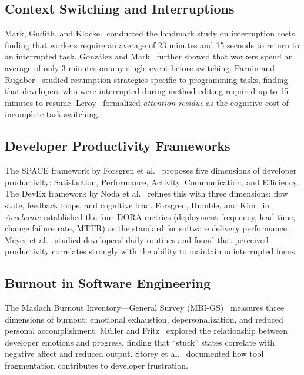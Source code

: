 \documentclass[12pt]{article}
\begin{document}
\subsection{Context Switching and Interruptions}

Mark, Gudith, and Klocke~\cite{mark2008cost} conducted the landmark study on interruption costs, finding that workers require an average of 23 minutes and 15 seconds to return to an interrupted task. Gonz\'{a}lez and Mark~\cite{gonzalez2004constant} further showed that workers spend an average of only 3 minutes on any single event before switching. Parnin and Rugaber~\cite{parnin2011resumption} studied resumption strategies specific to programming tasks, finding that developers who were interrupted during method editing required up to 15 minutes to resume. Leroy~\cite{leroy2009why} formalized \emph{attention residue} as the cognitive cost of incomplete task switching.

\subsection{Developer Productivity Frameworks}

The SPACE framework by Forsgren et al.~\cite{forsgren2021space} proposes five dimensions of developer productivity: Satisfaction, Performance, Activity, Communication, and Efficiency. The DevEx framework by Noda et al.~\cite{noda2023devex} refines this with three dimensions: flow state, feedback loops, and cognitive load. Forsgren, Humble, and Kim~\cite{forsgren2018accelerate} in \emph{Accelerate} established the four DORA metrics (deployment frequency, lead time, change failure rate, MTTR) as the standard for software delivery performance. Meyer et al.~\cite{meyer2019today} studied developers' daily routines and found that perceived productivity correlates strongly with the ability to maintain uninterrupted focus.

\subsection{Burnout in Software Engineering}

The Maslach Burnout Inventory---General Survey (MBI-GS)~\cite{maslach1996maslach} measures three dimensions of burnout: emotional exhaustion, depersonalization, and reduced personal accomplishment. M\"{u}ller and Fritz~\cite{muller2015stuck} explored the relationship between developer emotions and progress, finding that ``stuck'' states correlate with negative affect and reduced output. Storey et al.~\cite{storey2020software} documented how tool fragmentation contributes to developer frustration.
\end{document}
